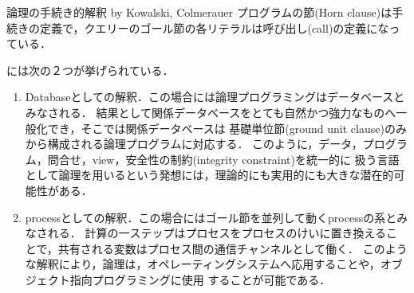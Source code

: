\documentclass[uplatex, 12pt, dvipdfmx]{jsreport}
\begin{document}
\begin{itembox}[l]{論理の手続き的解釈 by Kowalski, Colmerauer}
    プログラムの節(Horn clause)は手続きの定義で，クエリーのゴール節の各リテラルは呼び出し(call)の定義になっている．
\end{itembox}

\begin{remark}[論理の手続きとして以外の解釈]
    \cite{論理プログラミングの基礎}には次の２つが挙げられている．
    \begin{enumerate}
        \item Databaseとしての解釈．この場合には論理プログラミングはデータベースとみなされる．
        結果として関係データベースをとても自然かつ強力なものへ一般化でき，そこでは関係データベースは
        基礎単位節(ground unit clause)のみから構成される論理プログラムに対応する．
        このように，データ，プログラム，問合せ，view，安全性の制約(integrity constraint)を統一的に
        扱う言語として論理を用いるという発想には，理論的にも実用的にも大きな潜在的可能性がある．
        \item processとしての解釈．この場合にはゴール節を並列して動くprocessの系とみなされる．
        計算の一ステップはプロセスをプロセスのけいに置き換えることで，共有される変数はプロセス間の通信チャンネルとして働く．
        このような解釈により，論理は，オペレーティングシステムへ応用することや，オブジェクト指向プログラミングに使用
        することが可能である．
    \end{enumerate}
\end{remark}
\end{document}
